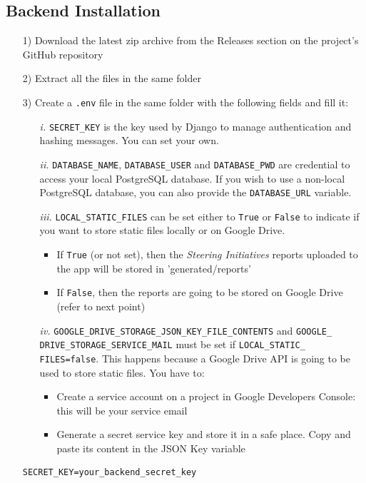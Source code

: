 \documentclass[table, 12pt]{article}
\begin{document}
\subsection{Backend Installation}
\begin{itemize}
    \item[1)] Download the latest zip archive from the Releases section on the project's GitHub repository
    \item[2)] Extract all the files in the same folder
    \item[3)] Create a \texttt{.env} file in the same folder with the following fields and fill it:
    \begin{itemize}
        \item[\textit{i.}] \texttt{SECRET\_KEY} is the key used by Django to manage authentication and hashing messages. You can set your own.
        \item[\textit{ii.}] \texttt{DATABASE\_NAME}, \texttt{DATABASE\_USER} and \texttt{DATABASE\_PWD} are credential to access your local PostgreSQL database. If you wish to use a non-local PostgreSQL database, you can also provide the \texttt{DATABASE\_URL} variable.
        \item[\textit{iii.}] \texttt{LOCAL\_STATIC\_FILES} can be set either to \texttt{True} or \texttt{False} to indicate if you want to store static files locally or on Google Drive.
        \begin{itemize}
            \item If \texttt{True} (or not set), then the \emph{Steering Initiatives} reports uploaded to the app will be stored in 'generated/reports'
            \item If \texttt{False}, then the reports are going to be stored on Google Drive (refer to next point)
        \end{itemize} 
        \item[\textit{iv.}] \texttt{GOOGLE\_DRIVE\_STORAGE\_JSON\_KEY\_FILE\_CONTENTS} and \texttt{GOOGLE\_\\DRIVE\_STORAGE\_SERVICE\_MAIL} must be set if \texttt{LOCAL\_STATIC\_\\FILES=false}. This happens because a Google Drive API is going to be used to store static files. You have to:
        \begin{itemize}
            \item Create a service account on a project in Google Developers Console: this will be your service email
            \item Generate a secret service key and store it in a safe place. Copy and paste its content in the JSON Key variable
        \end{itemize}      
    \end{itemize}
    \begin{lstlisting}[language=shell]
SECRET_KEY=your_backend_secret_key


\end{lstlisting}
\end{itemize}
\end{document}
